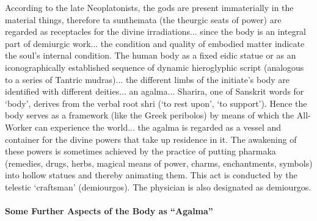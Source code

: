 \begin{quotex}
According to the late Neoplatonists, the gods are present immaterially in the material things, therefore ta sunthemata (the theurgic seats of power) are regarded as receptacles for the divine irradiations... since the body is an integral part of demiurgic work... the condition and quality of embodied matter indicate the soul's internal condition. The human body as a fixed eidic statue or as an iconographically established sequence of dynamic hieroglyphic script (analogous to a series of Tantric mudras)... the different limbs of the initiate's body are identified with different deities... an agalma... Sharira, one of Sanskrit words for `body', derives from the verbal root shri (`to rest upon', `to support'). Hence the body serves as a framework (like the Greek peribolos) by means of which the All-Worker can experience the world... the agalma is regarded as a vessel and container for the divine powers that take up residence in it. The awakening of these powers is sometimes achieved by the practice of putting pharmaka (remedies, drugs, herbs, magical means of power, charms, enchantments, symbols) into hollow statues and thereby animating them. This act is conducted by the telestic `craftsman' (demiourgos). The physician is also designated as demiourgos.
\end{quotex}


\paragraph{Some Further Aspects of the Body as ``Agalma''}


